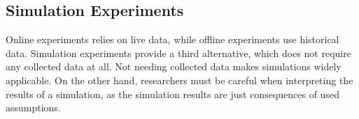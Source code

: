 %
%
%

\subsection{Simulation Experiments}

Online experiments relies on live data,
while offline experiments use historical data.
Simulation experiments provide a third alternative,
  which does not require any collected data at all.
Not needing collected data makes simulations widely applicable.
On the other hand, researchers must be careful when interpreting
  the results of a simulation, as the simulation results are %
  just consequences of used assumptions.

